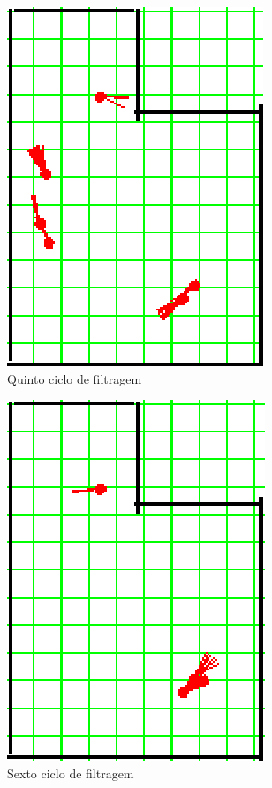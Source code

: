 \begin{figure}[H]
  \centering
  \includegraphics[scale=1]{figuras/cen4_ex4/6.eps}
  \caption[Quinto Ciclo de Filtragem]{Quinto ciclo de filtragem}
  \label{img:cen4_ex4_6}
\end{figure}

\begin{figure}[H]
  \centering
  \includegraphics[scale=1]{figuras/cen4_ex4/7.eps}
  \caption[Sexto Ciclo de Filtragem]{Sexto ciclo de filtragem}
  \label{img:cen4_ex4_7}
\end{figure}

